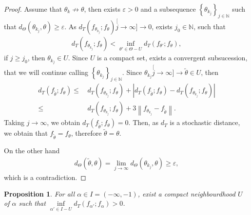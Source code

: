 \documentclass[journal]{IEEEtran}
\newtheorem{proposition}{Proposition}
\numberwithin{equation}{section}
\newenvironment{dem}[1][Proof]{\begin{proof}[{\it #1}]}{\end{proof}}
\newcommand{\al}{&\,}
\newcommand{\N}{\ensuremath{\mathbb{N}}}
\newcommand{\abs}[1]{\ensuremath{\left| #1 \right|}}
\newcommand{\norm}[1]{\ensuremath{\left\| #1 \right\|}}
\newcommand{\pa}[1]{\ensuremath{\left( #1 \right)}}
\newcommand{\set}[1]{\ensuremath{\left\{ #1 \right\}}}
\begin{document}
\begin{dem}
	Assume that $\theta_{k}\not\to\theta$, then exists $\varepsilon>0$ and a subsequence
	$\set{\theta_{k_{j}}}_{j\in\N}$ such that $d_{\Theta}\pa{\theta_{k_{j}},\theta}\ge\varepsilon$.
	As $d_{T}\pa{f_{\theta_{k_{j}}};f_{\theta}}\stackrel[j\to\infty]{}{\longrightarrow}  0$, exists $j_{0}\in\N$, such that 
	\begin{align*}
	d_{T}\pa{f_{\theta_{k_{j}}};f_{\theta}} < \inf_{\theta'\in \Theta-U}d_{T}\pa{f_{\theta'};f_{\theta}},
	\end{align*}
	if $j\ge j_{0}$, then $\theta_{k_{j}}\in U$. Since $U$ is a compact set, exists a convergent subsucession,
	that we will continue calling $\set{\theta_{k_{j}}}_{j\in\N}$.
	Since $\theta_{k_{j}}\stackrel[j\to\infty]{}{\longrightarrow} \tilde{\theta}\in U$, then
	\begin{align*}
	d_{T}\pa{f_{\tilde{\theta}};f_{\theta}} \le \al d_{T}\pa{f_{\theta_{k_{j}}};f_{\theta}}
	+ \abs{d_{T}\pa{f_{\tilde{\theta}};f_{\theta}} - d_{T}\pa{f_{\theta_{k_{j}}};f_{\theta}}} \\
	\le \al d_{T}\pa{f_{\theta_{k_{j}}};f_{\theta}} + 3 \norm{f_{\theta_{k_{j}}} - f_{\tilde{\theta}}}.
	\end{align*}
	Taking $j\to\infty$, we obtain $d_{T}\pa{f_{\tilde{\theta}};f_{\theta}} = 0$. Then, as $d_T$ is a stochastic distance, we obtain that $f_{\tilde{\theta}}=f_{\theta}$, therefore  $\tilde{\theta}=\theta$.
	
	On the other hand
	\begin{align*}
	d_{\Theta}\pa{\tilde{\theta},\theta} = \lim_{j\to\infty}d_{\Theta}\pa{\theta_{k_{j}},\theta}\ge\varepsilon,
	\end{align*}
	which is a contradiction.
\end{dem}

\begin{proposition}
	\label{pr: falpha>0}
	For all $\alpha\in I=(-\infty,-1)$, exist a compact neighbourdhood $U$ of $\alpha$ such that
	$\inf\limits_{\alpha'\in I-U}d_{T}\pa{f_{\alpha'};f_{\alpha}}>0$.
\end{proposition}
\end{document}
